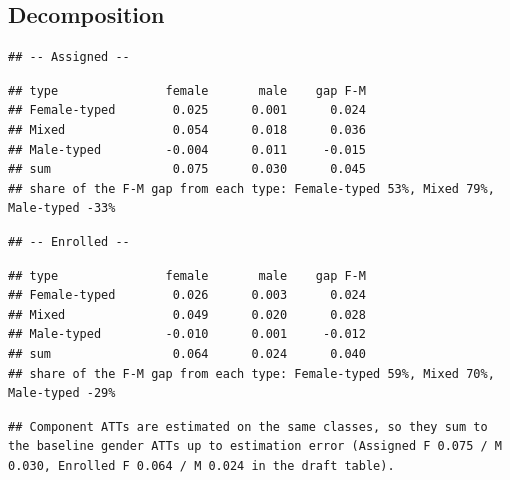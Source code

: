 \documentclass[
]{article}
\begin{document}
\begin{table}[htbp]
   \caption{Enrollment by Destination-Program Type and Gender}\label{tab: gender enrolled by program type}
   \centerline{}
\end{table}

\hypertarget{decomposition}{%
\subsection{Decomposition}\label{decomposition}}

\begin{verbatim}
## -- Assigned --
\end{verbatim}

\begin{verbatim}
## type               female       male    gap F-M
## Female-typed        0.025      0.001      0.024
## Mixed               0.054      0.018      0.036
## Male-typed         -0.004      0.011     -0.015
## sum                 0.075      0.030      0.045
## share of the F-M gap from each type: Female-typed 53%, Mixed 79%, Male-typed -33%
\end{verbatim}

\begin{verbatim}
## -- Enrolled --
\end{verbatim}

\begin{verbatim}
## type               female       male    gap F-M
## Female-typed        0.026      0.003      0.024
## Mixed               0.049      0.020      0.028
## Male-typed         -0.010      0.001     -0.012
## sum                 0.064      0.024      0.040
## share of the F-M gap from each type: Female-typed 59%, Mixed 70%, Male-typed -29%
\end{verbatim}

\begin{verbatim}
## Component ATTs are estimated on the same classes, so they sum to the baseline gender ATTs up to estimation error (Assigned F 0.075 / M 0.030, Enrolled F 0.064 / M 0.024 in the draft table).
\end{verbatim}
\end{document}
